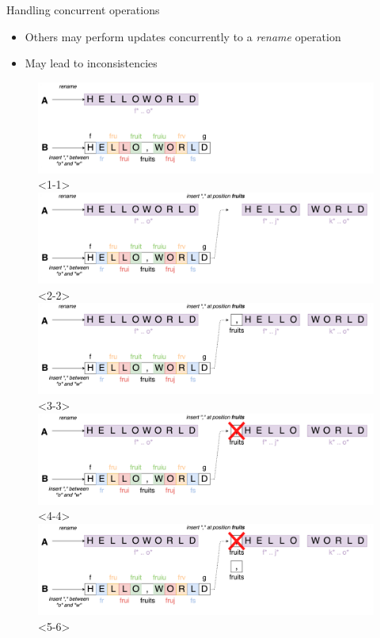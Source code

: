 \documentclass[10pt]{beamer}
\begin{document}
\begin{frame}{Handling concurrent operations}
  \begin{itemize}
    \item Others may perform updates concurrently to a \emph{rename} operation
    \item<4-> May lead to inconsistencies
  \end{itemize}
  \begin{figure}
    \includegraphics[scale=0.08]{img/concurrent-insert-rename-1.png}<1-1>
    \includegraphics[scale=0.08]{img/concurrent-insert-rename-2.png}<2-2>
    \includegraphics[scale=0.08]{img/concurrent-insert-rename-3.png}<3-3>
    \includegraphics[scale=0.08]{img/concurrent-insert-rename-4.png}<4-4>
    \includegraphics[scale=0.08]{img/concurrent-insert-rename-5.png}<5-6>

\end{figure}
\end{frame}
\end{document}
